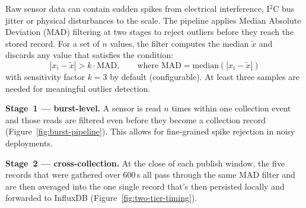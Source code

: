 Raw sensor data can contain sudden spikes from electrical interference, I$^2$C bus jitter or physical disturbances to the scale. The pipeline applies Median Absolute Deviation (MAD) filtering \parencite{leys2013mad} at two stages to reject outliers before they reach the stored record. For a set of $n$ values, the filter computes the median $\tilde{x}$ and discards any value that satisfies the condition:
\begin{equation}
    |x_i - \tilde{x}| > k \cdot \text{MAD}, \qquad \text{where } \text{MAD} = \text{median}(|x_i - \tilde{x}|)
\end{equation}
with sensitivity factor $k = 3$ by default (configurable). At least three samples are needed for meaningful outlier detection.

\textbf{Stage~1 — burst-level.} A sensor is read $n$ times within one collection event and those reads are filtered even before they become a collection record (Figure~\ref{fig:burst-pipeline}). This allows for fine-grained spike rejection in noisy deployments.

\textbf{Stage~2 — cross-collection.} At the close of each publish window, the five records that were gathered over 600\,s all pass through the same MAD filter and are then averaged into the one single record that's then persisted locally and forwarded to InfluxDB (Figure~\ref{fig:two-tier-timing}). 

